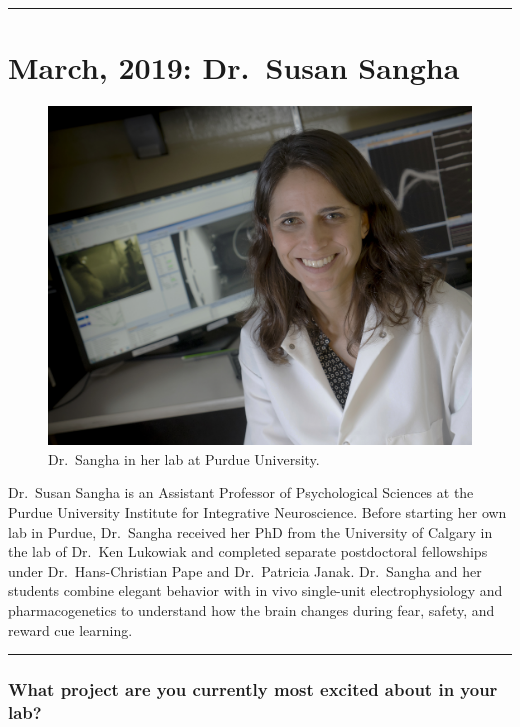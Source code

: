 \documentclass[]{article}
\title{}
\author{}
\date{}
\begin{document}
\begin{center}\rule{0.5\linewidth}{\linethickness}\end{center}

\section{March, 2019: Dr.~Susan
Sangha}\label{march-2019-dr.susan-sangha}

\begin{figure}
\centering
\includegraphics{./photos/Sangha_lab.jpg}
\caption{Dr.~Sangha in her lab at Purdue University.}
\end{figure}

Dr.~Susan Sangha is an Assistant Professor of Psychological Sciences at
the Purdue University Institute for Integrative Neuroscience. Before
starting her own lab in Purdue, Dr.~Sangha received her PhD from the
University of Calgary in the lab of Dr.~Ken Lukowiak and completed
separate postdoctoral fellowships under Dr.~Hans-Christian Pape and
Dr.~Patricia Janak. Dr.~Sangha and her students combine elegant behavior
with in vivo single-unit electrophysiology and pharmacogenetics to
understand how the brain changes during fear, safety, and reward cue
learning.

\begin{center}\rule{0.5\linewidth}{\linethickness}\end{center}

\subsubsection{\texorpdfstring{\textbf{What project are you currently
most excited about in your
lab?}}{What project are you currently most excited about in your lab?}}\label{what-project-are-you-currently-most-excited-about-in-your-lab}
\end{document}
